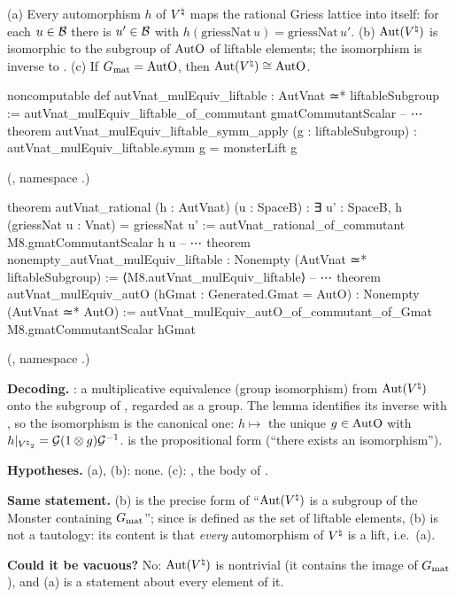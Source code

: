 \begin{theorem}\label{ch22:thm:converse}
(a) Every automorphism $h$ of ${V^{\natural}}$ maps the rational Griess lattice into itself: for each $u\in\mathcal{B}$ there is
$u'\in\mathcal{B}$ with $h(\mathrm{griessNat}\,u)=\mathrm{griessNat}\,u'$.
(b) $\operatorname{Aut}({V^{\natural}})$ is isomorphic to the subgroup of $\mathrm{AutO}$ of liftable elements; the isomorphism is inverse to
.
(c) If $G_{\mathrm{mat}}=\mathrm{AutO}$, then $\operatorname{Aut}({V^{\natural}})\cong\mathrm{AutO}$.
\end{theorem}
\begin{leancode}
noncomputable def autVnat_mulEquiv_liftable : AutVnat ≃* liftableSubgroup :=
  autVnat_mulEquiv_liftable_of_commutant gmatCommutantScalar
-- ⋯
theorem autVnat_mulEquiv_liftable_symm_apply (g : liftableSubgroup) :
    autVnat_mulEquiv_liftable.symm g = monsterLift g
\end{leancode}
(, namespace .)
\begin{leancode}
theorem autVnat_rational (h : AutVnat) (u : SpaceB) :
    ∃ u' : SpaceB, h (griessNat u : Vnat) = griessNat u' :=
  autVnat_rational_of_commutant M8.gmatCommutantScalar h u
-- ⋯
theorem nonempty_autVnat_mulEquiv_liftable : Nonempty (AutVnat ≃* liftableSubgroup) :=
  ⟨M8.autVnat_mulEquiv_liftable⟩
-- ⋯
theorem autVnat_mulEquiv_autO (hGmat : Generated.Gmat = AutO) : Nonempty (AutVnat ≃* AutO) :=
  autVnat_mulEquiv_autO_of_commutant_of_Gmat M8.gmatCommutantScalar hGmat
\end{leancode}
(, namespace .)
\begin{dictionary}
\textbf{Decoding.}  : a multiplicative equivalence (group isomorphism) from $\operatorname{Aut}({V^{\natural}})$ onto
the subgroup  of , regarded as a group.  The  lemma identifies its inverse
with , so the isomorphism is the canonical one: $h\mapsto$ the unique $g\in\mathrm{AutO}$ with
$h|_{{V^{\natural}}_2}=\mathcal G(1\otimes g)\mathcal G^{-1}$.   is the propositional form (``there exists an isomorphism'').

\textbf{Hypotheses.}  (a), (b): none.  (c): , the body of .

\textbf{Same statement.}  (b) is the precise form of ``$\operatorname{Aut}({V^{\natural}})$ is a subgroup of the Monster containing
$G_{\mathrm{mat}}$''; since  is defined as the set of liftable elements, (b) is not a tautology: its
content is that \emph{every} automorphism of ${V^{\natural}}$ is a lift, i.e.\ (a).

\textbf{Could it be vacuous?}  No: $\operatorname{Aut}({V^{\natural}})$ is nontrivial (it contains the image of $G_{\mathrm{mat}}$), and
(a) is a statement about every element of it.
\end{dictionary}
